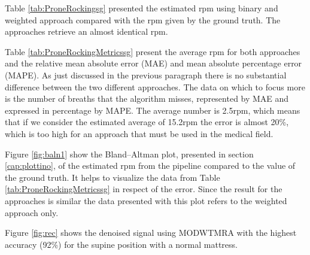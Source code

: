 Table \ref{tab:ProneRockingsg} presented the estimated rpm using binary and weighted approach compared with the rpm given by the ground truth. The approaches retrieve an almost identical rpm. 

\vspace{0.5cm}


Table \ref{tab:ProneRockingMetricssg} present the average rpm for both approaches  
and the relative mean absolute error (MAE) and mean absolute percentage error (MAPE). As just discussed in the previous paragraph there is no substantial difference between the two different approaches. The data on which to focus more is the number of breaths that the algorithm misses, represented by MAE and expressed in percentage by MAPE. The average number is 2.5rpm, which means that if we consider the estimated average of 15.2rpm the error is almost 20\%, which is too high for an approach that must be used in the medical field.



Figure \ref{fig:baln1} show the Bland–Altman plot, presented in section \ref{cap:plottino}, of the estimated rpm from the pipeline compared to the value of the ground truth. It helps to visualize the data from Table \ref{tab:ProneRockingMetricssg} in respect of the error. Since the result for the approaches is similar the data presented with this plot refers to the weighted approach only.

Figure \ref{fig:rec} shows the denoised signal using MODWTMRA with the highest accuracy (92\%) for the supine position with a normal mattress.

